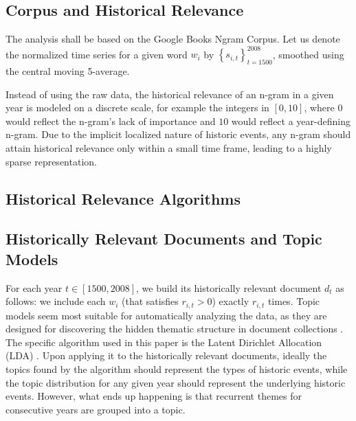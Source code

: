 
\subsection{Corpus and Historical Relevance}

The analysis shall be based on the Google Books Ngram Corpus. Let us denote the normalized time series for a given word $w_i$ by $\left\{ s_{i, t} \right\}_{t = 1500}^{2008}$, smoothed using the central moving 5-average.

Instead of using the raw data, the historical relevance of an n-gram in a given year is modeled on a discrete scale, for example the integers in $\left[ 0, 10 \right]$, where $0$ would reflect the n-gram's lack of importance and $10$ would reflect a year-defining n-gram. Due to the implicit localized nature of historic events, any n-gram should attain historical relevance only within a small time frame, leading to a highly sparse representation.

\subsection{Historical Relevance Algorithms}
\label{sec:historical-relevance-algorithms}


\subsection{Historically Relevant Documents and Topic Models}

For each year $t \in \left[ 1500, 2008 \right]$, we build its historically relevant document $d_t$ as follows: we include each $w_i$ (that satisfies $r_{i, t} > 0$) exactly $r_{i, t}$ times. Topic models seem most suitable for automatically analyzing the data, as they are designed for discovering the hidden thematic structure in document collections . The specific algorithm used in this paper is the Latent Dirichlet Allocation (LDA) . Upon applying it to the historically relevant documents, ideally the topics found by the algorithm should represent the types of historic events, while the topic distribution for any given year should represent the underlying historic events. However, what ends up happening is that recurrent themes for consecutive years are grouped into a topic.
